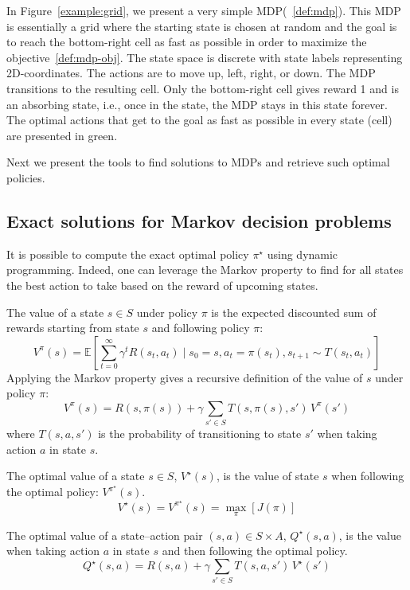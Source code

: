 In Figure~\ref{example:grid}, we present a very simple MDP(~\ref{def:mdp}).
This MDP is essentially a grid where the starting state is chosen at random and the goal is to reach the bottom-right cell as fast as possible in order to maximize the objective~\ref{def:mdp-obj}.
The state space is discrete with state labels representing 2D-coordinates.
The actions are to move up, left, right, or down. The MDP transitions to the resulting cell. 
Only the bottom-right cell gives reward 1 and is an absorbing state, i.e., once in the state, the MDP stays in this state forever.
The optimal actions that get to the goal as fast as possible in every state (cell) are presented in green.

Next we present the tools to find solutions to MDPs and retrieve such optimal policies.

\subsection{Exact solutions for Markov decision problems}\label{sec:values}
It is possible to compute the exact optimal policy $\pi^\star$ using dynamic programming\cite{Bellman}.
Indeed, one can leverage the Markov property to find for all states the best action to take based on the reward of upcoming states.
\begin{definition} The value of a state $s\in S$ under policy $\pi$ is the expected discounted sum of rewards starting from state $s$ and following policy $\pi$:
    $$V^\pi(s) = \mathbb{E}\left[\sum_{t=0}^{\infty} \gamma^t R(s_t, a_t) \mid s_0 = s, a_t = \pi(s_t), s_{t+1} \sim T(s_t, a_t)\right]$$
    Applying the Markov property gives a recursive definition of the value of $s$ under policy $\pi$:
    $$V^\pi(s) = R(s,\pi(s)) + \gamma \sum_{s' \in S} T(s,\pi(s),s')\,V^\pi(s')$$
    where $T(s,a,s')$ is the probability of transitioning to state $s'$ when taking action $a$ in state $s$.
\end{definition}
\begin{definition} The optimal value of a state $s\in S$, $V^\star(s)$, is the value of state $s$ when following the optimal policy: $V^{\pi^{\star}}(s)$.
    $$V^{\star}(s) = V^{\pi^{\star}}(s) = \underset{\pi}{\max}\left[J(\pi)\right]$$
\end{definition}
\begin{definition} The optimal value of a state–action pair $(s,a)\in S\times A$, $Q^\star(s,a)$, is the value when taking action $a$ in state $s$ and then following the optimal policy.
    $$Q^{\star}(s,a) = R(s, a) + \gamma\sum_{s'\in S} T(s,a,s')\,V^{\star}(s')$$
\end{definition}

